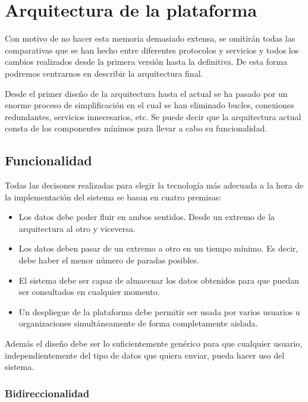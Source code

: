 \chapter{Arquitectura de la plataforma}
\pagestyle{esitscCD}

Con motivo de no hacer esta
memoria demasiado extensa, se omitirán todas las comparativas que se han hecho
entre diferentes protocolos y servicios y todos los cambios realizados desde la
primera versión hasta la definitiva. De esta forma podremos centrarnos en
describir la arquitectura final.

Desde el primer diseño de la arquitectura hasta el actual se ha pasado por un
enorme proceso de simplificación en el cual se han eliminado bucles, conexiones
redundantes, servicios innecesarios, etc. Se puede decir que la arquitectura
actual consta de los componentes mínimos para llevar a cabo su funcionalidad.

\section{Funcionalidad}

Todas las decisones realizadas para elegir la tecnología más adecuada a la hora
de la implementación del sistema se basan en cuatro premisas:

\begin{itemize}\itemsep1pt \parskip0pt 
\item {} Los datos debe poder fluir en ambos sentidos.
Desde un extremo de la arquitectura al otro y viceversa.
\item {} Los datos deben pasar de un extremo a otro en un
tiempo mínimo. Es decir, debe haber el menor número de paradas posibles.
\item {} El sistema debe ser capaz de almacenar los datos obtenidos para
que puedan ser consultados en cualquier momento.
\item {} Un despliegue de la plataforma debe permitir ser usada por
varios usuarios u organizaciones simultáneamente de forma completamente aislada.
\end{itemize}

Además el diseño debe ser lo suficientemente genérico para que cualquier
usuario, independientemente del tipo de datos que quiera enviar, pueda hacer uso
del sistema.

\subsection{Bidireccionalidad}

